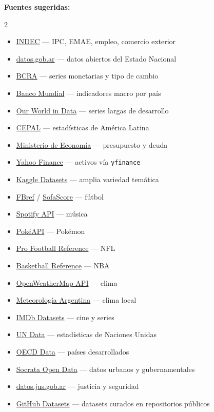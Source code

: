 \documentclass[11pt,a4paper]{article}
\begin{document}
\textbf{Fuentes sugeridas:}
\begin{multicols}{2}\small
\begin{itemize}[itemsep=1pt,leftmargin=1.2em]
  \item \href{https://www.indec.gob.ar}{INDEC} --- IPC, EMAE, empleo, comercio exterior
  \item \href{https://datos.gob.ar}{datos.gob.ar} --- datos abiertos del Estado Nacional
  \item \href{https://www.bcra.gob.ar}{BCRA} --- series monetarias y tipo de cambio
  \item \href{https://data.worldbank.org}{Banco Mundial} --- indicadores macro por país
  \item \href{https://ourworldindata.org}{Our World in Data} --- series largas de desarrollo
  \item \href{https://estadisticas.cepal.org}{CEPAL} --- estadísticas de América Latina
  \item \href{https://www.argentina.gob.ar/economia}{Ministerio de Economía} --- presupuesto y deuda
  \item \href{https://finance.yahoo.com}{Yahoo Finance} --- activos vía \texttt{yfinance}
  \item \href{https://www.kaggle.com/datasets}{Kaggle Datasets} --- amplia variedad temática
  \item \href{https://fbref.com}{FBref} / \href{https://sofascore.com}{SofaScore} --- fútbol
  \item \href{https://developer.spotify.com/documentation/web-api}{Spotify API} --- música
  \item \href{https://pokeapi.co}{PokéAPI} --- Pokémon
  \item \href{https://www.pro-football-reference.com}{Pro Football Reference} --- NFL
  \item \href{https://www.basketball-reference.com}{Basketball Reference} --- NBA
  \item \href{https://openweathermap.org/api}{OpenWeatherMap API} --- clima
  \item \href{https://climatologia.meteored.com.ar}{Meteorología Argentina} --- clima local
  \item \href{https://www.imdb.com/interfaces/}{IMDb Datasets} --- cine y series
  \item \href{https://data.un.org}{UN Data} --- estadísticas de Naciones Unidas
  \item \href{https://data.oecd.org}{OECD Data} --- países desarrollados
  \item \href{https://opendata.socrata.com}{Socrata Open Data} --- datos urbanos y gubernamentales
  \item \href{https://datos.jus.gob.ar}{datos.jus.gob.ar} --- justicia y seguridad
  \item \href{https://github.com/datasets}{GitHub Datasets} --- datasets curados en repositorios públicos
\end{itemize}
\end{multicols}
\end{document}
